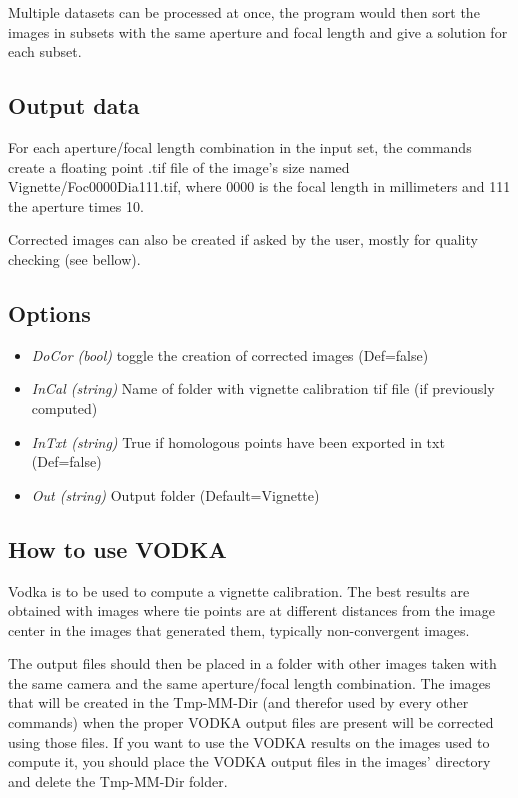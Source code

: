 Multiple datasets can be processed at once, the program would then sort the images in subsets with the same aperture and focal length and give a solution for each subset.

\subsection{Output data}
For each aperture/focal length combination in the input set, the commands create a floating point .tif file of the image's size named Vignette/Foc0000Dia111.tif, where 0000 is the focal length in millimeters and 111 the aperture times 10.


Corrected images can also be created if asked by the user, mostly for quality checking (see bellow).


\subsection{Options}
\begin{itemize}
\item{\textit{DoCor (bool)} toggle the creation of corrected images (Def=false)}
\item{\textit{InCal (string)} Name of folder with vignette calibration tif file (if previously computed)}
\item{\textit{InTxt (string)} True if homologous points have been exported in txt (Def=false)}
\item{\textit{Out (string)} Output folder (Default=Vignette)}
\end{itemize}

\subsection{How to use VODKA}
Vodka is to be used to compute a vignette calibration. The best results are obtained with images where tie points are at different distances from the image center in the images that generated them, typically non-convergent images.


The output files should then be placed in a folder with other images taken with the same camera and the same aperture/focal length combination. The images that will be created in the Tmp-MM-Dir (and therefor used by every other commands) when the proper VODKA output files are present will be corrected using those files. If you want to use the VODKA results on the images used to compute it, you should place the VODKA output files in the images' directory and delete the Tmp-MM-Dir folder.


